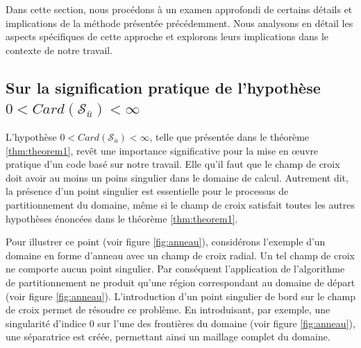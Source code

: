 Dans cette section, nous procédons à un examen approfondi de certains détails et implications de la méthode présentée précédemment. Nous analysons en détail les aspects spécifiques de cette approche et explorons leurs implications dans le contexte de notre travail.

\subsection{Sur la signification pratique de l'hypothèse $0<Card(\mathcal{S}_{\bar{u}})<\infty$}

L'hypothèse $0<Card(\mathcal{S}_{\bar{u}})<\infty$, telle que présentée dans le théorème \ref{thm:theorem1}, revêt une importance significative pour la mise en œuvre pratique d'un code basé sur notre travail. Elle qu'il faut que le champ de croix doit avoir au moins un poins singulier dans le domaine de calcul. Autrement dit, la présence d'un point singulier est essentielle pour le processus de partitionnement du domaine, même si le champ de croix satisfait toutes les autres hypothèses énoncées dans le théorème \ref{thm:theorem1}.

Pour illustrer ce point (voir figure \ref{fig:anneau}), considérons l'exemple d'un domaine en forme d'anneau avec un champ de croix radial. Un tel champ de croix ne comporte aucun point singulier. Par conséquent l'application de l'algorithme de partitionnement ne produit qu'une région correspondant au domaine de départ (voir figure \ref{fig:anneau}). L'introduction d'un point singulier de bord sur le champ de croix permet de résoudre ce problème. En introduisant, par exemple, une singularité d'indice 0 sur l'une des frontières du domaine (voir figure \ref{fig:anneau}), une séparatrice est créée, permettant ainsi un maillage complet du domaine.

